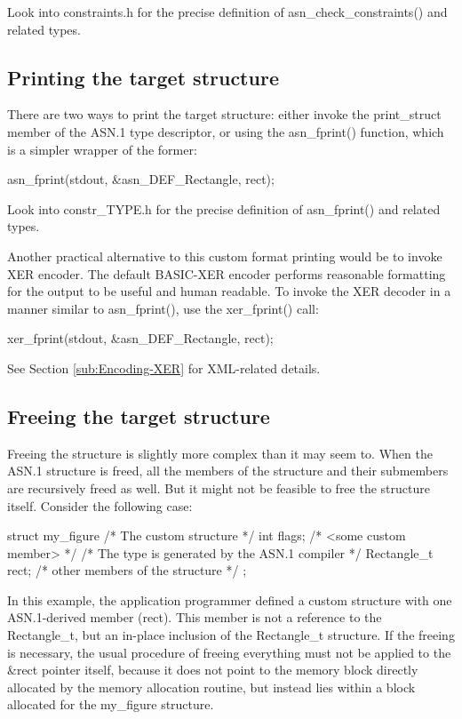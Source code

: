 \documentclass[english,oneside,12pt]{book}
\begin{document}
Look into constraints.h for the precise definition of asn\_check\_constraints()
and related types.


\subsection{\label{sub:Printing-the-target}Printing the target structure}

There are two ways to print the target structure: either invoke the
print\_struct member of the ASN.1 type descriptor, or using the asn\_fprint()
function, which is a simpler wrapper of the former:
\begin{codesample}
asn_fprint(stdout, &asn_DEF_Rectangle, rect);
\end{codesample}
Look into constr\_TYPE.h for the precise definition of asn\_fprint()
and related types.

Another practical alternative to this custom format printing would
be to invoke XER encoder. The default BASIC-XER encoder performs reasonable
formatting for the output to be useful and human readable. To invoke
the XER decoder in a manner similar to asn\_fprint(), use the xer\_fprint()
call:
\begin{codesample}
xer_fprint(stdout, &asn_DEF_Rectangle, rect);
\end{codesample}
See Section \vref{sub:Encoding-XER} for XML-related details.


\subsection{\label{sub:Freeing-the-target}Freeing the target structure}

Freeing the structure is slightly more complex than it may seem to.
When the ASN.1 structure is freed, all the members of the structure
and their submembers are recursively freed as well. But it might not
be feasible to free the structure itself. Consider the following case:
\begin{codesample}
struct my_figure {       /* The custom structure */
    int flags;           /* <some custom member> */
    /* The type is generated by the ASN.1 compiler */
    Rectangle_t rect;
    /* other members of the structure */
};
\end{codesample}
In this example, the application programmer defined a custom structure
with one ASN.1-derived member (rect). This member is not a reference
to the Rectangle\_t, but an in-place inclusion of the Rectangle\_t
structure. If the freeing is necessary, the usual procedure of freeing
everything must not be applied to the \&rect pointer itself, because
it does not point to the memory block directly allocated by the memory
allocation routine, but instead lies within a block allocated for
the my\_figure structure.
\end{document}
